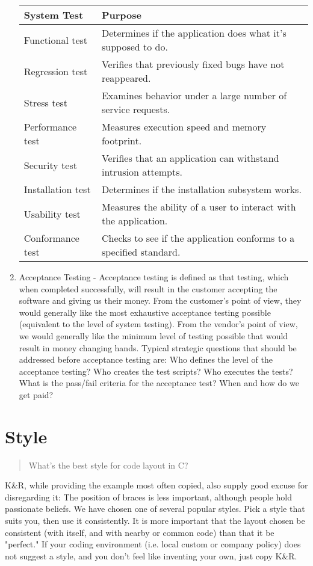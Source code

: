 \documentclass{report}
\begin{document}
\begin{enumerate}
\begin{tabular}{|l|l|}
\hline
System Test       & Purpose\\
\hline
Functional test   & Determines if the application does what it's supposed to do.\\
\hline
Regression test   & Verifies that previously fixed bugs have not reappeared.\\
\hline
Stress test       & Examines behavior under a large number of service requests.\\
\hline
Performance test  & Measures execution speed and memory footprint.\\
\hline
Security test     & Verifies that an application can withstand intrusion attempts.\\
\hline
Installation test & Determines if the installation subsystem works.\\
\hline
Usability test    & Measures the ability of a user to interact with the application.\\
\hline
Conformance test  & Checks to see if the application conforms to a specified standard.\\
\hline
\end{tabular}

\item Acceptance Testing - Acceptance testing is defined as that testing, which when completed successfully, will result in the customer accepting the software and giving us their money. From the customer's point of view, they would generally like the most exhaustive acceptance testing possible (equivalent to the level of system testing). From the vendor's point of view, we would generally like the minimum level of testing possible that would result in money changing hands. Typical strategic questions that should be addressed before acceptance testing are: Who defines the level of the acceptance testing? Who creates the test scripts? Who executes the tests? What is the pass/fail criteria for the acceptance test? When and how do we get paid?
\end{enumerate}

\section{Style}
\begin{quote}
What's the best style for code layout in C?
\end{quote}
K\&R, while providing the example most often copied, also supply good excuse for disregarding it:
The position of braces is less important, although people hold passionate beliefs.
We have chosen one of several popular styles.
Pick a style that suits you, then use it consistently.
It is more important that the layout chosen be consistent (with itself, and with nearby or common code) than that it be "perfect."  If your coding environment (i.e. local custom or company policy) does not suggest a style, and you don't feel like inventing your own, just copy K\&R.
\end{document}
